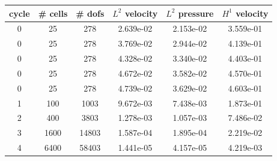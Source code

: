 \documentclass[10pt]{report}
\begin{document}
\begin{table}[H]
\begin{center}
\begin{tabular}{|c|c|c|c|c|c|} \hline
cycle & \# cells & \# dofs & $L^2$ velocity & $L^2$ pressure & $H^1$ velocity\\ \hline
0 & 25 & 278 & 2.639e-02 & 2.153e-02 & 3.559e-01\\ \hline
0 & 25 & 278 & 3.769e-02 & 2.944e-02 & 4.139e-01\\ \hline
0 & 25 & 278 & 4.328e-02 & 3.340e-02 & 4.403e-01\\ \hline
0 & 25 & 278 & 4.672e-02 & 3.582e-02 & 4.570e-01\\ \hline
0 & 25 & 278 & 4.739e-02 & 3.629e-02 & 4.603e-01\\ \hline
1 & 100 & 1003 & 9.672e-03 & 7.438e-03 & 1.873e-01\\ \hline
2 & 400 & 3803 & 1.278e-03 & 1.057e-03 & 7.486e-02\\ \hline
3 & 1600 & 14803 & 1.587e-04 & 1.895e-04 & 2.219e-02\\ \hline
4 & 6400 & 58403 & 1.441e-05 & 4.157e-05 & 4.219e-03\\ \hline
\end{tabular}
\end{center}
\end{table}
\end{document}
